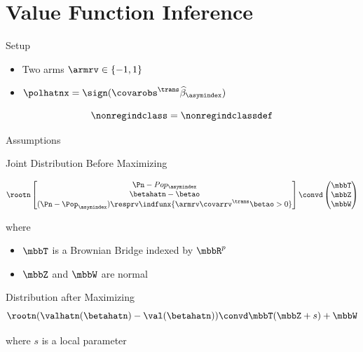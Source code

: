 \documentclass[aspectratio=169, professionalfonts]{beamer}
\begin{document}
\section{Value Function Inference}
\begin{frame}{Setup}
	\begin{itemize}
		\item	Two arms $\armrv \in \{-1, 1\}$
		\item $\polhatnx = \sign(\covarobs^{\trans}\widehat{\beta}_{\asymindex})$
	\end{itemize}

	\begin{displaymath}
		\nonregindclass = \nonregindclassdef
	\end{displaymath}
\end{frame}

\begin{frame}{Assumptions}
\end{frame}

\begin{frame}{Joint Distribution Before Maximizing}

	\begin{displaymath}
		\rootn \begin{bmatrix}\Pn - Pop_{\asymindex} \\
			\betahatn - \betao     \\
			(\Pn - \Pop_{\asymindex})\resprv \indfunx{\armrv \covarrv^{\trans}\betao
				> 0}\end{bmatrix} \convd \begin{pmatrix} \mbbT \\ \mbbZ \\
			\mbbW\end{pmatrix}
	\end{displaymath}

	where

	\begin{itemize}
		\item $\mbbT$ is a Brownian Bridge indexed by $\mbbR^p$
		\item $\mbbZ$ and $\mbbW$ are normal
	\end{itemize}
\end{frame}

\begin{frame}{Distribution after Maximizing}
	\begin{displaymath}
		\rootn (\valhatn (\betahatn) - \val(\betahatn)) \convd \mbbT(\mbbZ + s)
		+ \mbbW
	\end{displaymath}

	where $s$ is a local parameter

\end{frame}
\end{document}
